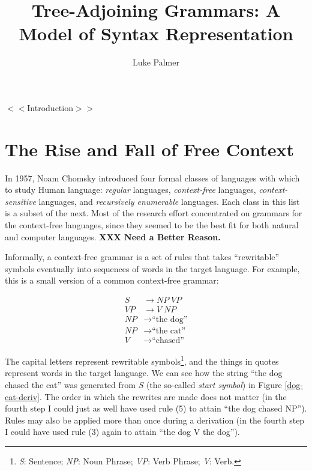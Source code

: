 \documentclass[12pt]{article}
\title{Tree-Adjoining Grammars: A Model of Syntax Representation}
\author{Luke Palmer}
\newcommand{\defn}[1]{\textit{#1}}
\newcommand{\XXX}[1]{\textbf{XXX #1}}
\begin{document}
\maketitle
\doublespace

$<<$Introduction$>>$

\section{The Rise and Fall of Free Context}
\label{sec-free-context}

In 1957, Noam Chomsky introduced four formal classes of languages with
which to study Human language:  \defn{regular} languages,
\defn{context-free} languages, \defn{context-sensitive} languages,
and \defn{recursively enumerable} languages.  Each class in this list
is a subset of the next.  Most of the research effort concentrated on
grammars for the context-free languages, since they seemed to be the
best fit for both natural and computer languages. \XXX{Need a
Better Reason.}

Informally, a context-free grammar is a set of rules that takes
``rewritable'' symbols eventually into sequences of words in the target
language.  For example, this is a small version of a common context-free
grammar:

\begin{align}
S  &\rightarrow \mathit{NP} \; \mathit{VP}      \tag{1} \\
\mathit{VP} &\rightarrow V \; \mathit{NP}       \tag{2} \\
\mathit{NP} &\rightarrow \text{``the dog''}     \tag{3} \\
\mathit{NP} &\rightarrow \text{``the cat''}     \tag{4} \\
V  &\rightarrow \text{``chased''}               \tag{5}
\end{align}

The capital letters represent rewritable symbols\footnote{\textit{S}:
Sentence; \textit{NP}: Noun Phrase; \textit{VP}: Verb Phrase;
\textit{V}: Verb.}, and the things in quotes represent words in the
target language.  We can see how the string ``the dog chased the cat''
was generated from $S$ (the so-called \defn{start symbol}) in Figure
\ref{dog-cat-deriv}.  The order in which the rewrites are made does not
matter (in the fourth step I could just as well have used rule (5) to
attain ``the dog chased NP'').  Rules may also be applied more than once
during a derivation (in the fourth step I could have used rule (3) again
to attain ``the dog V the dog'').
\end{document}
